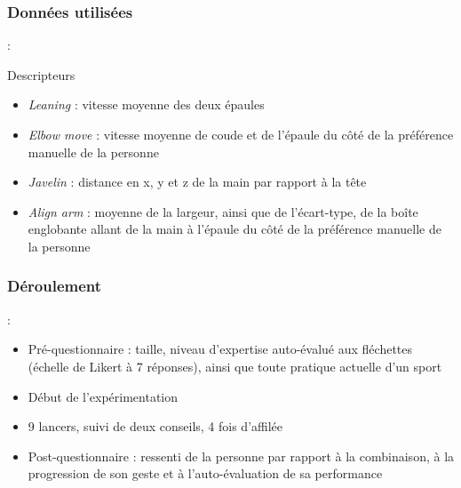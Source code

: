 \documentclass[svgnames]{beamer}
\begin{document}
	\subsubsection{Données utilisées}
	\begin{frame}{\subsecname : \MakeLowercase{\subsubsecname}}
		\begin{block}{Descripteurs}
			\begin{itemize}[label=$\bullet$]
				\item \textit{Leaning} : vitesse moyenne des deux épaules
				\item \textit{Elbow move} : vitesse moyenne de coude et de l'épaule du côté de la préférence manuelle de la personne
				\item \textit{Javelin} : distance en x, y et z de la main par rapport à la tête
				\item \textit{Align arm} : moyenne de la largeur, ainsi que de l'écart-type, de la boîte englobante allant de la main à l'épaule du côté de la préférence manuelle de la personne
			\end{itemize}
		\end{block}
	\end{frame}
	
	\subsubsection{Déroulement}
	\begin{frame}{\subsecname : \MakeLowercase{\subsubsecname}}
		\begin{itemize}[label=$\bullet$]
			\item Pré-questionnaire : taille, niveau d'expertise auto-évalué aux fléchettes (échelle de Likert à 7 réponses), ainsi que toute pratique actuelle d'un sport
			\item Début de l'expérimentation
			\item 9 lancers, suivi de deux conseils, 4 fois d'affilée
			\item Post-questionnaire : ressenti de la personne par rapport à la combinaison, à la progression de son geste et à l'auto-évaluation de sa performance
		\end{itemize}
		
	\end{frame}
	
\end{document}
